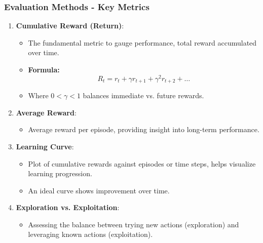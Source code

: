 \documentclass[aspectratio=169]{beamer}
\begin{document}
\begin{frame}[fragile]
    \frametitle{Evaluation Methods - Key Metrics}
    \begin{enumerate}
        \item \textbf{Cumulative Reward (Return)}:
        \begin{itemize}
            \item The fundamental metric to gauge performance, total reward accumulated over time.
            \item \textbf{Formula:}
            \begin{equation}
            R_t = r_t + \gamma r_{t+1} + \gamma^2 r_{t+2} + \ldots
            \end{equation}
            \item Where $0 < \gamma < 1$ balances immediate vs. future rewards.
        \end{itemize}
        
        \item \textbf{Average Reward}:
        \begin{itemize}
            \item Average reward per episode, providing insight into long-term performance.
        \end{itemize}
        
        \item \textbf{Learning Curve}:
        \begin{itemize}
            \item Plot of cumulative rewards against episodes or time steps, helps visualize learning progression.
            \item An ideal curve shows improvement over time.
        \end{itemize}
        
        \item \textbf{Exploration vs. Exploitation}:
        \begin{itemize}
            \item Assessing the balance between trying new actions (exploration) and leveraging known actions (exploitation).
        \end{itemize}
    \end{enumerate}
\end{frame}
\end{document}
